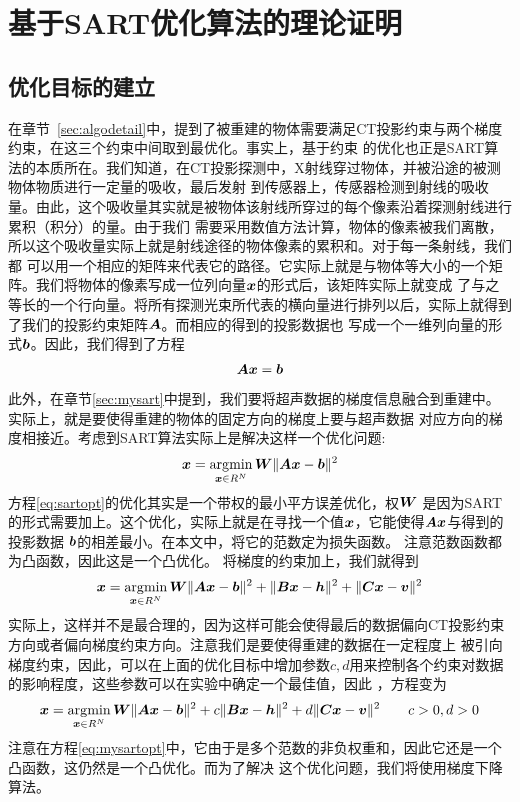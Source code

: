 \section{基于SART优化算法的理论证明}
\subsection{优化目标的建立}\label{sec:optobj}
在章节~\ref{sec:algodetail}中，提到了被重建的物体需要满足CT投影约束与两个梯度约束，在这三个约束中间取到最优化。事实上，基于约束
的优化也正是SART算法的本质所在。我们知道，在CT投影探测中，X射线穿过物体，并被沿途的被测物体物质进行一定量的吸收，最后发射
到传感器上，传感器检测到射线的吸收量。由此，这个吸收量其实就是被物体该射线所穿过的每个像素沿着探测射线进行累积（积分）的量。由于我们
需要采用数值方法计算，物体的像素被我们离散，所以这个吸收量实际上就是射线途径的物体像素的累积和。对于每一条射线，我们都
可以用一个相应的矩阵来代表它的路径。它实际上就是与物体等大小的一个矩阵。我们将物体的像素写成一位列向量$\bm{ x}$的形式后，该矩阵实际上就变成
了与之等长的一个行向量。将所有探测光束所代表的横向量进行排列以后，实际上就得到了我们的投影约束矩阵$\bm{A}$。而相应的得到的投影数据也
写成一个一维列向量的形式$\bm{b}$。因此，我们得到了方程
\begin{equation}
\bm{A}\bm{ x} = \bm{b} \label{eq:tomocon}
\end{equation}
此外，在章节\ref{sec:mysart}中提到，我们要将超声数据的梯度信息融合到重建中。实际上，就是要使得重建的物体的固定方向的梯度上要与超声数据
对应方向的梯度相接近。考虑到SART算法实际上是解决这样一个优化问题:
\begin{equation}
\bm{ x} = \operatorname*{\arg\!\min}_{\bm{ x}\in R^N}\bm{W}\lVert\bm{A}\bm{ x}-\bm{b}\rVert^2 \label{eq:sartopt}
\end{equation}
方程\eqref{eq:sartopt}的优化其实是一个带权的最小平方误差优化，权$\bm{W}$ 是因为SART的形式需要加上。这个优化，实际上就是在寻找一个值$\bm{ x}$，它能使得$\bm{A}\bm{ x}$与得到的投影数据 $\bm{b}$的相差最小。在本文中，将它的范数定为损失函数。
注意范数函数都为凸函数，因此这是一个凸优化。
将梯度的约束加上，我们就得到
\begin{equation}
\bm{ x} = \operatorname*{\arg\!\min}_{\bm{ x}\in R^N}\bm{W}\lVert\bm{A}\bm{ x}-\bm{b}\rVert^2 +\lVert\bm{B}\bm{ x}-\bm{h}\rVert^2+\lVert\bm{C}\bm{ x}-\bm{v}\rVert^2 \notag
\end{equation}
实际上，这样并不是最合理的，因为这样可能会使得最后的数据偏向CT投影约束方向或者偏向梯度约束方向。注意我们是要使得重建的数据在一定程度上
被引向梯度约束，因此，可以在上面的优化目标中增加参数$c,d$用来控制各个约束对数据的影响程度，这些参数可以在实验中确定一个最佳值，因此
，方程变为
\begin{equation}
\bm{ x} = \operatorname*{\arg\!\min}_{\bm{ x}\in R^N}\bm{W}\lVert\bm{A}\bm{ x}-\bm{b}\rVert^2 +c\lVert\bm{B}\bm{ x}-\bm{h}\rVert^2+d\lVert\bm{C}\bm{ x}-\bm{v}\rVert^2 \qquad c>0,d>0 \label{eq:mysartopt}
\end{equation}
注意在方程\eqref{eq:mysartopt}中，它由于是多个范数的非负权重和，因此它还是一个凸函数\cite{boyd2004convex}，这仍然是一个凸优化。而为了解决
这个优化问题，我们将使用梯度下降算法\cite{nesterov2003}。



